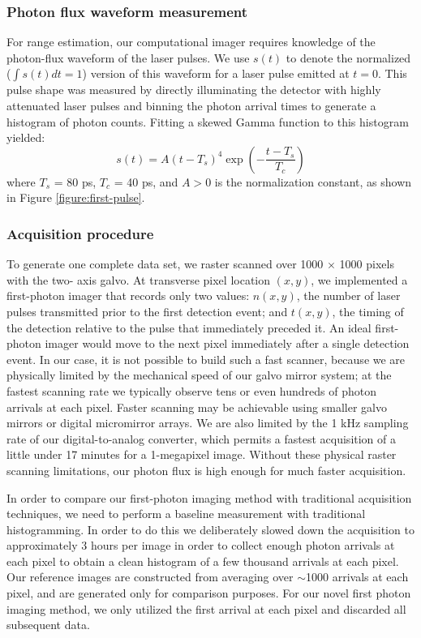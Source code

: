 \subsubsection{Photon flux waveform measurement}
For range estimation, our computational imager requires knowledge of the photon-flux waveform of the laser pulses. We use $s(t)$ to denote the normalized ($\int s(t) dt = 1$) version of this
waveform for a laser pulse emitted at $t = 0$. This pulse shape was measured by directly
illuminating the detector with highly attenuated laser pulses and binning the photon arrival times
to generate a histogram of photon counts. Fitting a skewed Gamma function to this histogram
yielded:
\begin{equation}
s(t) = A (t - T_s)^4 \exp \left( -\frac{t-T_s}{T_c} \right)
\end{equation}
where $T_s$ = 80 ps, $T_c$ = 40 ps, and $A>0$ is the normalization constant, as shown in Figure \ref{figure:first-pulse}.

\subsubsection{Acquisition procedure}
To generate one complete data set, we raster scanned over 1000 $\times$ 1000 pixels with the two-
axis galvo. At transverse pixel location $(x, y)$, we implemented a first-photon imager that records only two values: $n(x, y)$, the number of laser pulses transmitted prior to the first detection event; and $t(x, y)$, the timing of the detection relative to the pulse that immediately preceded it. An ideal first-photon imager would move to the next pixel immediately after a single detection event.
In our case, it is not possible to build such a fast scanner, because we are physically limited by the mechanical speed of our galvo mirror system; at the fastest scanning rate we typically observe tens or even hundreds of photon arrivals at each pixel. Faster scanning may be achievable using smaller galvo mirrors or digital micromirror arrays. We are also limited by the 1 kHz sampling rate of our digital-to-analog converter, which permits a fastest acquisition of a little under 17 minutes for a 1-megapixel image. Without these physical raster scanning limitations, our photon flux is high enough for much faster acquisition.

In order to compare our first-photon imaging method with traditional acquisition techniques, we need to perform a baseline measurement with traditional histogramming. In order to do this we deliberately slowed down the acquisition to approximately 3 hours per image in order to collect enough photon arrivals at each pixel to obtain a clean histogram of a few thousand arrivals at each pixel. Our reference images are constructed from averaging over $\sim$1000 arrivals at each pixel, and are generated only for comparison purposes. For our novel first photon imaging method, we only utilized the first arrival at each pixel and discarded all subsequent data.

